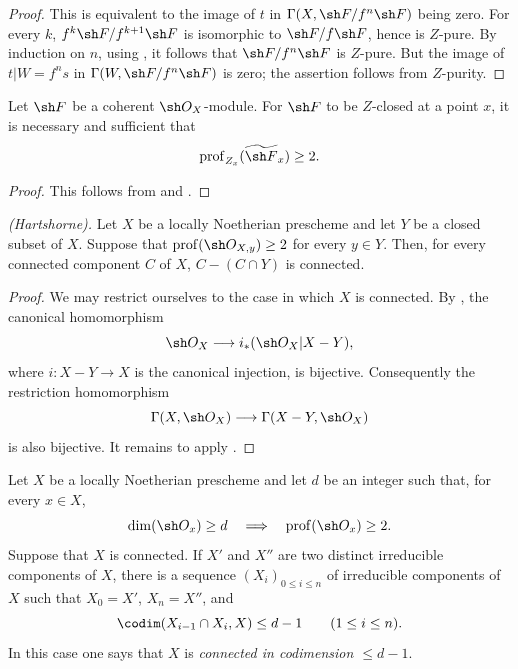 \begin{proof}

This is equivalent to the image of $t$ in
$\Gamma(X,\sh F/f^n\sh F)$ being zero.  For every $k$,
$f^k\sh F/f^{k+1}\sh F$ is isomorphic to $\sh F/f\sh F$, hence is
$Z$-pure.  By induction on $n$, using , it follows
that $\sh F/f^n\sh F$ is $Z$-pure.  But the image of
$t|W=f^ns$ in $\Gamma(W,\sh F/f^n\sh F)$ is zero; the assertion
follows from $Z$-purity.
\end{proof}

\begin{corollary}[5.10.6]
\label{IV.5.10.6}
Let $\sh F$ be a coherent $\sh O_X$-module.  For $\sh F$ to be
$Z$-closed at a point $x$, it is necessary and sufficient that
\[
  \operatorname{prof}_{Z_x}(\widetilde{\sh F}_x)\geq2.
\]
\end{corollary}

\begin{proof}
This follows from  and .
\end{proof}

\begin{theorem}[5.10.7]
\label{IV.5.10.7}
\emph{(Hartshorne).}
Let $X$ be a locally Noetherian prescheme and let $Y$ be a closed
subset of $X$.  Suppose that
$\operatorname{prof}(\sh O_{X,y})\geq2$ for every $y\in Y$.
Then, for every connected component $C$ of $X$,
$C-(C\cap Y)$ is connected.
\end{theorem}

\begin{proof}
We may restrict ourselves to the case in which $X$ is connected.
By , the canonical homomorphism
\[
  \sh O_X\longrightarrow i_*(\sh O_X|X-Y),
\]
where $i:X-Y\to X$ is the canonical injection, is bijective.
Consequently the restriction homomorphism
\[
  \Gamma(X,\sh O_X)\longrightarrow\Gamma(X-Y,\sh O_X)
\]
is also bijective.  It remains to apply
.
\end{proof}

\begin{corollary}[5.10.8]
\label{IV.5.10.8}
Let $X$ be a locally Noetherian prescheme and let $d$ be an
integer such that, for every $x\in X$,
\[
  \dim(\sh O_x)\geq d
  \quad\Longrightarrow\quad
  \operatorname{prof}(\sh O_x)\geq2.
\]
Suppose that $X$ is connected.  If $X'$ and $X''$ are two
distinct irreducible components of $X$, there is a sequence
$(X_i)_{0\leq i\leq n}$ of irreducible components of $X$ such
that $X_0=X'$, $X_n=X''$, and
\[
  \codim(X_{i-1}\cap X_i,X)\leq d-1
  \qquad(1\leq i\leq n).
\]
In this case one says that $X$ is
\emph{connected in codimension $\leq d-1$}.
\end{corollary}

